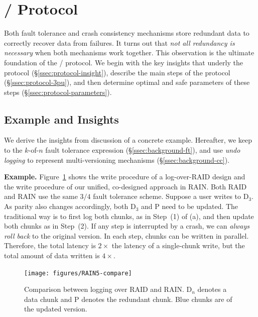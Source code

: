 \vspace{-1em}
\section{\protocol/ Protocol}
\vspace{-0.5em}
\label{sec:protocol}

Both fault tolerance and crash consistency mechanisms store redundant data to
correctly recover data from failures. It turns out that \emph{not all
redundancy is necessary} when both mechanisms work together. This observation is the 
ultimate foundation of the \protocol/ protocol. We begin with the
key insights that underly the protocol (\S\ref{ssec:protocol-insight}), 
describe the main steps of the protocol (\S\ref{ssec:protocol-3pu}), and then
determine optimal and safe parameters of
these steps (\S\ref{ssec:protocol-parameters}).

\subsection{Example and Insights}
\vspace{-0.5em}
\label{ssec:protocol-insight}

We derive the insights from discussion of a concrete example.
Hereafter, we keep to the $k$-of-$n$ fault tolerance expression
(\S\ref{ssec:background-ft}), and use \emph{undo logging} to represent
multi-versioning mechanisms (\S\ref{ssec:background-cc}).

\noindent
\textbf{Example.}
Figure~\ref{fig:rain5-compare} shows the write procedure of a log-over-RAID
design and the write procedure of our unified, co-designed approach in RAIN. Both RAID and
RAIN use the same $3/4$ fault tolerance scheme.  Suppose a user writes to
D$_3$. As parity also changes accordingly, both D$_3$ and P need to be updated.
The traditional way is to first log both chunks, as in Step~(1) of (a), and then  update both chunks as in Step~(2).  If any step is
interrupted by a crash, we can {\em always roll back} to the original version.
In each step, chunks can be written in parallel.  Therefore, the total latency
is $2\times$ the latency of a single-chunk write, but the total amount of data
written is $4\times$.

\begin{figure}[!h]
  \centering
  \vspace{-0.5em}
  \texttt{[image: figures/RAIN5-compare]}
  \caption{Comparison between logging over RAID and
RAIN. D$_n$ denotes a data chunk and P denotes the redundant chunk. Blue chunks
are of the updated version.}
  \vspace{-0.5em}
  \label{fig:rain5-compare}
\end{figure}

